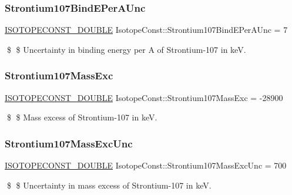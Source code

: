 \subsubsection{\texorpdfstring{Strontium107\+Bind\+E\+Per\+A\+Unc}{Strontium107BindEPerAUnc}}
{\footnotesize\ttfamily \mbox{\hyperlink{group___isotope_const-_macros_ga8f45a7272ce02c0b4c65c44636ed719a}{I\+S\+O\+T\+O\+P\+E\+C\+O\+N\+S\+T\+\_\+\+D\+O\+U\+B\+LE}} Isotope\+Const\+::\+Strontium107\+Bind\+E\+Per\+A\+Unc = 7}

\$ \$ Uncertainty in binding energy per A of Strontium-\/107 in keV. \mbox{\label{group___isotope_const-_strontium-_sr107_gaeb87660fe4fe20aa54b8a2df5402dfe5}} 
\subsubsection{\texorpdfstring{Strontium107\+Mass\+Exc}{Strontium107MassExc}}
{\footnotesize\ttfamily \mbox{\hyperlink{group___isotope_const-_macros_ga8f45a7272ce02c0b4c65c44636ed719a}{I\+S\+O\+T\+O\+P\+E\+C\+O\+N\+S\+T\+\_\+\+D\+O\+U\+B\+LE}} Isotope\+Const\+::\+Strontium107\+Mass\+Exc = -\/28900}

\$ \$ Mass excess of Strontium-\/107 in keV. \mbox{\label{group___isotope_const-_strontium-_sr107_ga33931c661c065909a4b9b282e84ebf3f}} 
\subsubsection{\texorpdfstring{Strontium107\+Mass\+Exc\+Unc}{Strontium107MassExcUnc}}
{\footnotesize\ttfamily \mbox{\hyperlink{group___isotope_const-_macros_ga8f45a7272ce02c0b4c65c44636ed719a}{I\+S\+O\+T\+O\+P\+E\+C\+O\+N\+S\+T\+\_\+\+D\+O\+U\+B\+LE}} Isotope\+Const\+::\+Strontium107\+Mass\+Exc\+Unc = 700}

\$ \$ Uncertainty in mass excess of Strontium-\/107 in keV. \mbox{\label{group___isotope_const-_strontium-_sr107_ga5f18144ae00097f4f95717a4db533897}} 
